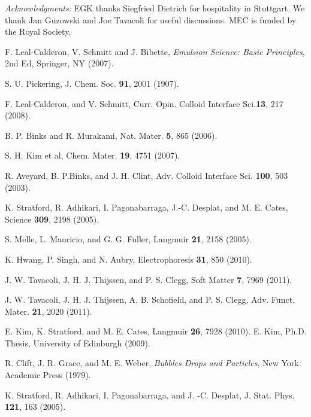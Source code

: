 \documentclass[aps,prl,superscriptaddress,twocolumn,showpacs,floatfix]{revtex4-1}
\begin{document}
\textit{Acknowledgments:}
EGK thanks Siegfried Dietrich for hospitality in Stuttgart. We thank Jan Guzowski and Joe Tavacoli for useful discussions. MEC is funded by the Royal Society.



\begin{thebibliography}{100}

F. Leal-Calderon, V. Schmitt and J. Bibette, \textit{Emulsion Science: Basic Principles}, 2nd Ed, Springer, NY (2007).

S. U. Pickering, J. Chem. Soc. \textbf{91}, 2001 (1907).


F. Leal-Calderon, and V. Schmitt, Curr. Opin. Colloid Interface Sci.\textbf{13}, 217 (2008).

 B. P. Binks and R. Murakami, Nat. Mater. \textbf{5}, 865 (2006). 

 S. H. Kim et al, Chem. Mater. \textbf{19}, 4751 (2007).
  
R. Aveyard, B. P.Binks, and J. H. Clint, Adv. Colloid Interface Sci. \textbf{100}, 503 (2003).


K. Stratford, R. Adhikari, I. Pagonabarraga, J.-C. Desplat, and M. E. Cates,  Science \textbf{309}, 2198 (2005).


S. Melle, L. Mauricio, and G. G. Fuller, Langmuir \textbf{21}, 2158 (2005).

K. Hwang, P. Singh, and N. Aubry, Electrophoresis \textbf{31}, 850 (2010).

J. W. Tavacoli, J. H. J. Thijssen, and P. S. Clegg, Soft Matter \textbf{7}, 7969 (2011).


J. W. Tavacoli, J. H. J. Thijssen, A. B. Schofield, and P. S. Clegg, Adv. Funct. Mater. \textbf{21}, 2020 (2011).
  
  
E. Kim, K. Stratford, and M. E. Cates, Langmuir \textbf{26}, 7928 (2010).
E. Kim, Ph.D. Thesis, University of Edinburgh (2009).


R. Clift, J. R. Grace, and M. E. Weber, \textit{Bubbles Drops and Particles}, New York: Academic Press (1979).

K. Stratford, R. Adhikari, I. Pagonabarraga, and J. -C. Desplat, J. Stat. Phys. \textbf{121}, 163 (2005).


\end{thebibliography}
\end{document}
